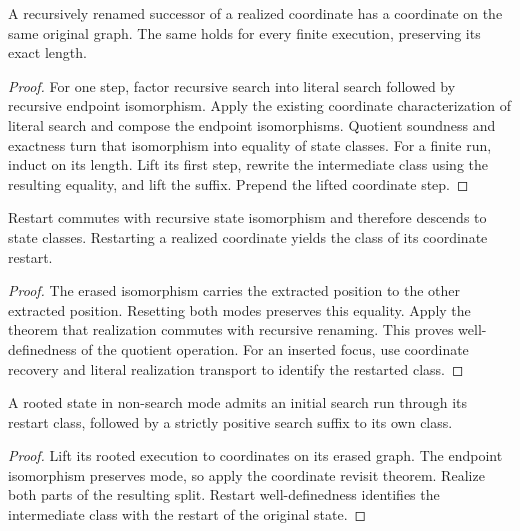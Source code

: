 \begin{lemma}
A recursively renamed successor of a realized coordinate has a coordinate on
the same original graph. The same holds for every finite execution, preserving
its exact length.
\end{lemma}
\begin{proof}
For one step, factor recursive search into literal search followed by recursive
endpoint isomorphism. Apply the existing coordinate characterization of literal
search and compose the endpoint isomorphisms. Quotient soundness and exactness
turn that isomorphism into equality of state classes. For a finite run, induct
on its length. Lift its first step, rewrite the intermediate class using the
resulting equality, and lift the suffix. Prepend the lifted coordinate step.
\end{proof}


\begin{lemma}
Restart commutes with recursive state isomorphism and therefore descends to
state classes. Restarting a realized coordinate yields the class of its
coordinate restart.
\end{lemma}
\begin{proof}
The erased isomorphism carries the extracted position to the other extracted
position. Resetting both modes preserves this equality. Apply the theorem that
realization commutes with recursive renaming. This proves well-definedness of
the quotient operation. For an inserted focus, use coordinate recovery and
literal realization transport to identify the restarted class.
\end{proof}


\begin{theorem}
A rooted state in non-search mode admits an initial search run through its
restart class, followed by a strictly positive search suffix to its own class.
\end{theorem}
\begin{proof}
Lift its rooted execution to coordinates on its erased graph. The endpoint
isomorphism preserves mode, so apply the coordinate revisit theorem. Realize
both parts of the resulting split. Restart well-definedness identifies the
intermediate class with the restart of the original state.
\end{proof}


